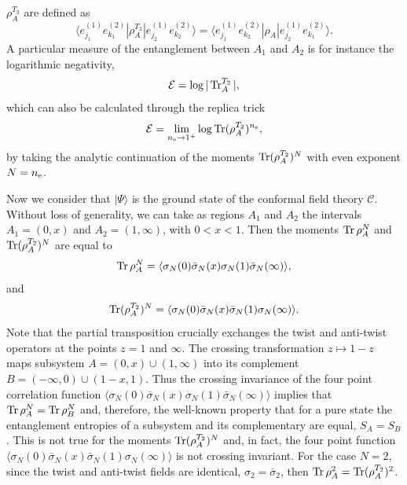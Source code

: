 \documentclass[a4paper,11pt]{article}
\def\Tr{\mathop{\mbox{\normalfont Tr}}\nolimits}
\begin{document}
$\rho_A^{T_2}$ are defined as 
\begin{equation}
\langle e_{j_1}^{(1)}e_{k_1}^{(2)}| \rho_A^{T_2} |e_{j_2}^{(1)}e_{k_2}^{(2)}\rangle=
\langle e_{j_1}^{(1)}e_{k_2}^{(2)}| \rho_A |e_{j_2}^{(1)}e_{k_1}^{(2)}\rangle.
\end{equation}
A particular measure of the entanglement between $A_1$ and $A_2$ is for instance the logarithmic negativity,
\begin{equation}
 \mathcal{E}=\log|\Tr_A^{T_2}|,
\end{equation}
which can also be calculated through the replica trick 
\begin{equation}
 \mathcal{E}=\lim_{n_{\rm e}\to 1^+}\log\Tr(\rho_A^{T_2})^{n_{\rm e}},
\end{equation}
by taking the analytic continuation of the moments $\Tr(\rho_A^{T_2})^N$
with even exponent $N=n_{\rm e}$.

Now we consider that $|\Psi\rangle$ is the ground state of the conformal field
theory $\mathcal{C}$. Without loss of generality, we can take as regions $A_1$ 
and $A_2$ the intervals $A_1=(0, x)$ and $A_2=(1, \infty)$, with $0<x<1$. Then
the moments $\Tr\rho_A^N$ and $\Tr(\rho_A^{T_2})^N$ are equal to 
 \begin{equation}\label{red_mat_ft}
 \Tr\rho_A^N=\langle \sigma_N(0)\bar{\sigma}_N(x)\sigma_N(1)\bar{\sigma}_N(\infty)\rangle,
 \end{equation}
 and
 \begin{equation}\label{partial_trans_ft}
 \Tr(\rho_A^{T_2})^N=\langle \sigma_N(0)\bar{\sigma}_N(x)\bar{\sigma}_N(1)\sigma_N(\infty)\rangle.
 \end{equation}
Note that the partial transposition crucially exchanges the twist and anti-twist operators 
at the points $z=1$ and $\infty$. The crossing transformation $z\mapsto 1-z$ maps subsystem 
$A=(0, x)\cup(1, \infty)$ into its complement $B=(-\infty, 0)\cup(1-x, 1)$. Thus
the crossing invariance of the four point correlation function $\langle \sigma_N(0)
\bar{\sigma}_N(x) \sigma_N(1) \bar{\sigma}_N(\infty)\rangle$ implies that $\Tr\rho_A^N=\Tr\rho_B^N$
and, therefore, the well-known property that for a pure state the entanglement entropies of a 
subsystem and its complementary are equal, $S_A=S_B$. This is not true for the moments $\Tr(\rho_A^{T_2})^N$
and, in fact, the four point function $ \langle \sigma_N(0)\bar{\sigma}_N(x)\bar{\sigma}_N(1)\sigma_N(\infty)\rangle$
is not crossing invariant. For the case $N=2$, since the twist and anti-twist fields are identical, $\sigma_2=\bar{\sigma}_2$, 
then $\Tr\rho_A^2=\Tr(\rho_A^{T_2})^2$. 
\end{document}
